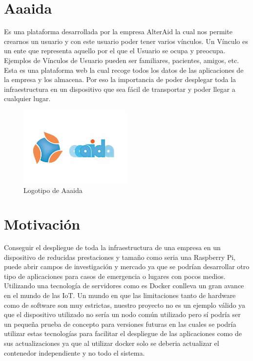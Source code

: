 \section{Aaaida}
Es una plataforma desarrollada por la empresa AlterAid la cual nos permite crearnos un usuario y con este usuario poder tener varios vínculos. Un Vínculo es un ente que representa aquello por el que el Usuario se ocupa y preocupa. Ejemplos de Vínculos de Usuario pueden ser familiares, pacientes, amigos, etc. 
Esta es una plataforma web la cual recoge todos los datos de las aplicaciones de la empresa y los almacena. Por eso la importancia de poder desplegar toda la infraestructura en un dispositivo que sea fácil de transportar y poder llegar a cualquier lugar.
\newpage
\begin{figure}[htb]
\begin{center}
\includegraphics[width=0.5\textwidth]{./setup/aaaidaLogo}
\caption{Logotipo de Aaaida}
\label{F:prova}
\end{center}
\end{figure}





\section{Motivación}

Conseguir el despliegue de toda la infraestructura de una empresa en un dispositivo de reducidas prestaciones y tamaño como seria una Raspberry Pi, puede abrir campos de investigación y mercado ya que se podrían desarrollar otro tipo de aplicaciones para casos de emergencia o lugares con pocos medios. 
Utilizando una tecnología de servidores como es Docker conlleva un gran avance en el mundo de las IoT.  Un mundo en que las limitaciones tanto de hardware como de software son muy estrictas, nuestro proyecto no es un ejemplo válido ya que el dispositivo utilizado no sería un nodo común utilizado pero sí podría ser un pequeña prueba de concepto para versiones futuras en las cuales se podría utilizar estas tecnologías para facilitar el despliegue de las aplicaciones como de sus actualizaciones ya que al utilizar docker solo se deberia actualizar el contenedor independiente y no todo el sistema.

